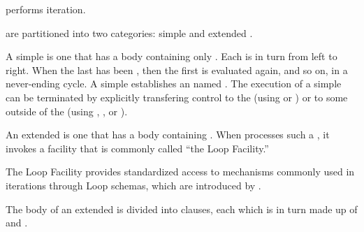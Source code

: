 

 performs iteration.


  are partitioned into two categories: 
     simple   
 and extended  .


A simple   is one that has a body containing
only .
Each  is  in turn from left to right.
When the last  has been , 
then the first  is evaluated again, and so on, in a never-ending cycle.
A simple   establishes an  named \nil.
The execution of a simple  can be terminated by explicitly
transfering control to the  (using  or
) or to some  outside of the  
(\eg using , , or ).


\endsubsubsubsection%

An extended   is one that has a body containing
 .  When  processes such a
, it invokes a facility that is commonly called ``the Loop Facility.''

The Loop Facility provides standardized access to mechanisms commonly used 
in iterations through Loop schemas, which are introduced by .

The body of an extended   is divided into  clauses,
each which is in turn made up of  and . 

\endsubsubsubsection%

\endsubsubsection%

